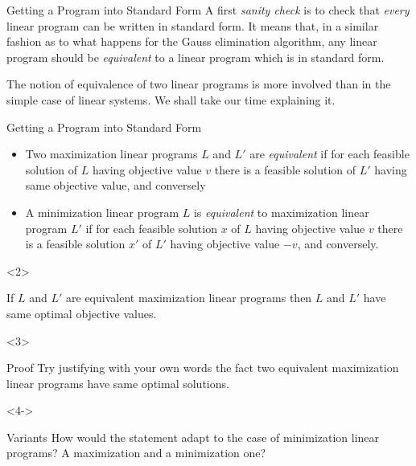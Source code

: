 \documentclass[aspectratio = 169]{beamer}
\begin{document}
\begin{frame}{Getting a Program into Standard Form}
  A first \textit{sanity check} is to check that \emph{every} linear
  program can be written in standard form. It means that, in a similar
  fashion as to what happens for the Gauss elimination algorithm, any
  linear program should be \textit{equivalent} to a linear program
  which is in standard form.

  The notion of equivalence of two linear programs is more involved
  than in the simple case of linear systems. We shall take our time
  explaining it.
\end{frame}

\begin{frame}{Getting a Program into Standard Form}
  \begin{defn}
    \begin{itemize}
    \item[\textbullet]
      Two maximization linear programs $L$ and $L'$ are
      \emph{equivalent} if for each feasible solution of $L$
      having objective value $v$ there is a feasible solution of
      $L'$ having same objective value, and conversely
    \item[\textbullet]
      A minimization linear program $L$ is \emph{equivalent} to
      maximization linear program $L'$ if for each feasible
      solution $x$ of $L$ having objective value $v$ there is a
      feasible solution $x'$ of $L'$ having objective value $-v$,
      and conversely.
    \end{itemize}
  \end{defn}
  \begin{overlayarea}{\textwidth}{.3\textheight}
    \vspace{-1em}
    \begin{onlyenv}<2>
      \begin{prop}
        If $L$ and $L'$ are equivalent maximization linear programs
        then $L$ and $L'$ have same optimal objective values.
      \end{prop}
    \end{onlyenv}
    \begin{onlyenv}<3>
      \vspace{1em}
      \begin{halfshyblock}{Proof}
        Try justifying with your own words the fact two equivalent
        maximization linear programs have same optimal solutions.
      \end{halfshyblock}
    \end{onlyenv}
    \begin{onlyenv}<4->
      \vspace{1em}
      \begin{halfshyblock}{Variants}
        How would the statement adapt to the case of minimization
        linear programs? A maximization and a minimization one?
      \end{halfshyblock}
    \end{onlyenv}
  \end{overlayarea}
\end{frame}
\end{document}
